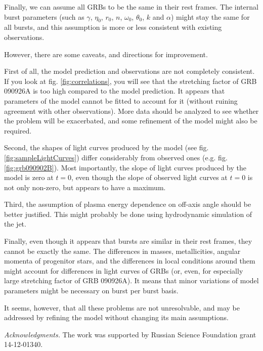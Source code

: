 \documentclass[11pt,a4paper]{article}
\begin{document}
Finally, we can assume all GRBs to be the same in their rest frames.
The internal burst parameters (such as $\gamma$, $\eta_0$, $r_0$, $n$, $\omega_0$, $\theta_0$, $k$ and $\alpha$) might stay the same for all bursts, and this assumption is more or less consistent with existing observations.

However, there are some caveats, and directions for improvement.

First of all, the model prediction and observations are not completely consistent.
If you look at fig. \ref{fig:correlations}, you will see that the stretching factor of GRB 090926A is too high compared to the model prediction.
It appears that parameters of the model cannot be fitted to account for it (without ruining agreement with other observations).
More data should be analyzed to see whether the problem will be exacerbated, and some refinement of the model might also be required.

Second, the shapes of light curves produced by the model (see fig. \ref{fig:sampleLightCurves}) differ considerably from observed ones (e.g. fig. \ref{fig:grb090902B}).
Most importantly, the slope of light curves produced by the model is zero at $t = 0$, even though the slope of observed light curves at $t = 0$ is not only non-zero, but appears to have a maximum.

Third, the assumption of plasma energy dependence on off-axis angle should be better justified.
This might probably be done using hydrodynamic simulation of the jet.

Finally, even though it appears that bursts are similar in their rest frames, they cannot be exactly the same.
The differences in masses, metallicities, angular momenta of progenitor stars, and the differences in local conditions around them might account for differences in light curves of GRBs (or, even, for especially large stretching factor of GRB 090926A).
It means that minor variations of model parameters might be necessary on burst per burst basis.

It seems, however, that all these problems are not unresolvable, and may be addressed by refining the model without changing its main assumptions.

{\small {\it Acknowledgments.} The work was supported by Russian Science Foundation grant 14-12-01340.}


\end{document}
